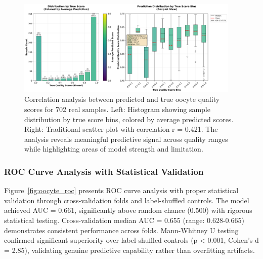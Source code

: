 \begin{figure}[H]
    \centering
    \includegraphics[width=0.95\textwidth]{figures/oocyte_correlation.png}
    \caption{Correlation analysis between predicted and true oocyte quality scores for 702 real samples. Left: Histogram showing sample distribution by true score bins, colored by average predicted scores. Right: Traditional scatter plot with correlation r = 0.421. The analysis reveals meaningful predictive signal across quality ranges while highlighting areas of model strength and limitation.}
    \label{fig:oocyte_correlation}
\end{figure}

\subsubsection{ROC Curve Analysis with Statistical Validation}

Figure~\ref{fig:oocyte_roc} presents ROC curve analysis with proper statistical validation through cross-validation folds and label-shuffled controls. The model achieved AUC = 0.661, significantly above random chance (0.500) with rigorous statistical testing. Cross-validation median AUC = 0.655 (range: 0.628-0.665) demonstrates consistent performance across folds. Mann-Whitney U testing confirmed significant superiority over label-shuffled controls (p < 0.001, Cohen's d = 2.85), validating genuine predictive capability rather than overfitting artifacts.

